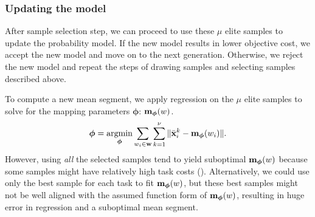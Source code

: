 
\subsubsection{Updating the model}
  After sample selection step, we can proceed to use these $\mu$ elite
  samples to update the probability model. If the new model results in
  lower objective cost, we accept the new model and move on to the
  next generation. Otherwise, we reject the new model and repeat the steps
  of drawing samples and selecting samples described above.


To compute a new mean segment, we apply regression on the $\mu$ elite
samples to solve for the mapping parameters $\boldsymbol{\phi}$: 
  $\mathbf{m}_{\boldsymbol{\phi}} (w)$. 
\begin{equation}
  \boldsymbol{\phi} = \argmin_{\boldsymbol{\phi}} \sum_{w_i \in \vc{w}} \sum_{k=1}^{\nu}\| \bar{\vc{x}}_i^{k} -
  \vc{m}_{\boldsymbol{\phi}} (w_i) \|.
  \label{eq:optskills_regression}
\end{equation}
However, using \emph{all} the selected samples tend to yield
suboptimal $\mathbf{m}_{\boldsymbol{\phi}}(w)$ because some samples might have
relatively high task costs (). Alternatively, we could use only the
best sample for each task to fit $\mathbf{m}_{\boldsymbol{\phi}}(w)$, but
these best samples might not be well aligned with the assumed
function form of $\mathbf{m}_{\boldsymbol{\phi}}(w)$, resulting in huge error
in regression and a suboptimal mean segment.




